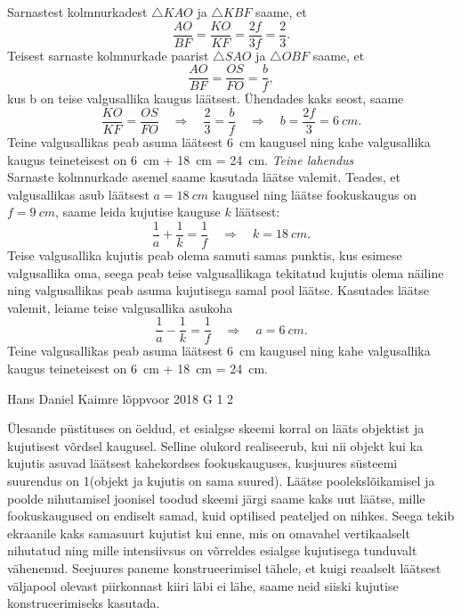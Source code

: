 \documentclass[11pt, twoside]{article}
\begin{document}
{{Sarnastest kolmnurkadest $\triangle KAO$ ja $\triangle KBF$ saame, et
\[ \frac{AO}{BF} = \frac{KO}{KF} = \frac{2f}{3f} = \frac{2}{3}. \]
Teisest sarnaste kolmnurkade paarist $\triangle SAO$ ja $\triangle OBF$ saame, et
\[  \frac{AO}{BF} = \frac{OS}{FO} = \frac{b}{f},  \]
kus b on teise valgusallika kaugus läätsest. Ühendades kaks seost, saame
\[ \frac{KO}{KF}=\frac{OS}{FO} \quad\Rightarrow\quad \frac{2}{3} = \frac{b}{f} \quad\Rightarrow\quad b = \frac{2f}{3} = \SI{6}{cm}. \]
Teine valgusallikas peab asuma läätsest \SI{6}{cm} kaugusel ning kahe valgusallika kaugus teineteisest on \SI{6}{cm} + \SI{18}{cm} = \SI{24}{cm}.
\vspace{\baselineskip}
\emph{Teine lahendus}\\
Sarnaste kolmnurkade asemel saame kasutada läätse valemit. Teades, et valgusallikas asub läätsest $a = \SI{18}{cm}$ kaugusel ning läätse fookuskaugus on $f=\SI{9}{cm}$, saame leida kujutise kauguse $k$ läätsest:
\[ \frac{1}{a} + \frac{1}{k} = \frac{1}{f} \quad\Rightarrow\quad k = \SI{18}{cm}. \]
Teise valgusallika kujutis peab olema samuti samas punktis, kus esimese valgusallika oma, seega peab teise valgusallikaga tekitatud kujutis olema näiline ning valgusallikas peab asuma kujutisega samal pool läätse. Kasutades läätse valemit, leiame teise valgusallika asukoha
\[ \frac{1}{a} - \frac{1}{k} = \frac{1}{f} \quad\Rightarrow\quad a = \SI{6}{cm}. \]
Teine valgusallikas peab asuma läätsest \SI{6}{cm} kaugusel ning kahe valgusallika kaugus teineteisest on \SI{6}{cm} + \SI{18}{cm} = \SI{24}{cm}.
\fi
}

{Hans Daniel Kaimre} %
{lõppvoor} %
{2018} %
{G 1} %
{2} %
{

\ifSolution
Ülesande püstituses on öeldud, et esialgse skeemi korral on lääts objektist ja kujutisest võrdsel kaugusel. Selline olukord realiseerub, kui nii objekt kui ka kujutis asuvad läätsest kahekordses fookuskauguses, kusjuures süsteemi suurendus on 1(objekt ja kujutis on sama suured). Läätse poolekslõikamisel ja poolde nihutamisel joonisel toodud skeemi järgi saame kaks uut läätse, mille fookuskaugused on endiselt samad, kuid optilised peateljed on nihkes. Seega tekib ekraanile kaks samasuurt kujutist kui enne, mis on omavahel vertikaalselt nihutatud ning mille intensiivsus on võrreldes esialgse kujutisega tunduvalt vähenenud. Seejuures paneme konstrueerimisel tähele, et kuigi reaalselt läätsest väljapool olevast piirkonnast kiiri läbi ei lähe, saame neid siiski kujutise konstrueerimiseks kasutada.

}}
\end{document}
